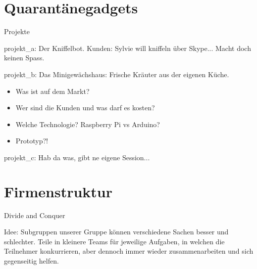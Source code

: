 \documentclass{beamer}
\begin{document}
\section{Quarant\"anegadgets}

\begin{frame}{Projekte}

\begin{exampleblock}{projekt\_a:}
Der Kniffelbot. Kunden: Sylvie will kniffeln \"uber Skype... Macht doch keinen Spass.
\end{exampleblock}

\begin{exampleblock}{projekt\_b:}
Das Minigew\"achshaus: Frische Kr\"auter aus der eigenen K\"uche.\\
\begin{itemize}
 \item Was ist auf dem Markt?
 \item Wer sind die Kunden und was darf es kosten?
 \item Welche Technologie? Raspberry Pi vs Arduino?
 \item Prototyp?!
\end{itemize}
\end{exampleblock}

\begin{exampleblock}{projekt\_c:}
Hab da was, gibt ne eigene Session...
\end{exampleblock}

\end{frame}


\section{Firmenstruktur}

\begin{frame}{Divide and Conquer}

\begin{alertblock}{Idee:}
Subgruppen unserer Gruppe k\"onnen verschiedene Sachen besser und schlechter. Teile in kleinere Teams f\"ur jeweilige Aufgaben, in welchen die Teilnehmer konkurrieren, aber dennoch immer wieder zusammenarbeiten und sich gegenseitig helfen.
\end{alertblock}

\end{frame}
\end{document}
